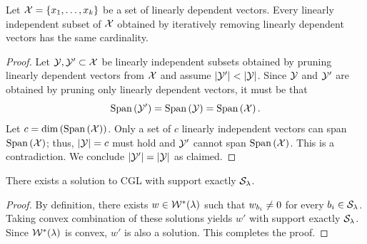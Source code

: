 \begin{lemma}\label{lemma:pruning-paths-equiv}
	Let \( \mathcal{X} = \left\{x_1, \ldots, x_k\right\} \) be a set of linearly dependent vectors.
	Every linearly independent subset of \( \mathcal{X} \) obtained by iteratively removing
	linearly dependent vectors has the same cardinality.
\end{lemma}
\begin{proof}
	Let \( \mathcal{Y}, \mathcal{Y}' \subset \mathcal{X} \) be linearly independent subsets
	obtained by pruning linearly dependent vectors from \( \mathcal{X} \) and assume
	\( |\mathcal{Y}'| < |\mathcal{Y}| \).
	Since \( \mathcal{Y} \) and \( \mathcal{Y}' \) are obtained by pruning only linearly
	dependent vectors, it must be that
	\[ \text{Span}\left(\mathcal{Y}'\right) = \text{Span}\left(\mathcal{Y}\right) = \text{Span}\left(\mathcal{X}\right). \]
	Let \( c = \text{dim}\left(\text{Span}\left(\mathcal{X}\right)\right) \).
	Only a set of \( c \) linearly independent vectors can span
	\( \text{Span}\left(\mathcal{X}\right) \);
	thus, \( |\mathcal{Y}| = c \) must hold and \( \mathcal{Y}' \) cannot span \( \text{Span}\left(\mathcal{X}\right) \).
	This is a contradiction.
	We conclude
	\( |\mathcal{Y}'| = |\mathcal{Y}| \)
	as claimed.
\end{proof}

\begin{lemma}\label{lemma:maximal-sol}
	There exists a solution to CGL with support exactly \( \mathcal{S}_\lambda \).
\end{lemma}
\begin{proof}
	By definition, there exists \( w \in \mathcal{W}^*(\lambda) \) such that
	\( w_{b_i} \neq 0 \) for every \( {b_i} \in \mathcal{S}_\lambda \).
	Taking convex combination of these solutions yields \( w' \) with support
	exactly \( \mathcal{S}_\lambda \).
	Since \( \mathcal{W}^*(\lambda) \) is convex, \( w' \) is also a solution.
	This completes the proof.
\end{proof}

